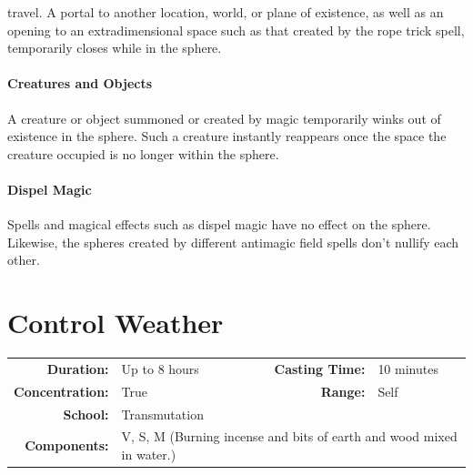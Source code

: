 \documentclass[12pt,showtrims]{memoir}
\begin{document}
travel. A portal to another location, world, or plane of existence, as well as an opening to an extradimensional space such as that created by the rope trick spell, temporarily closes while in the sphere. \paragraph{Creatures and Objects} A creature or object summoned or created by magic temporarily winks out of existence in the sphere. Such a creature instantly reappears once the space the creature occupied is no longer within the sphere. \paragraph{Dispel Magic} Spells and magical effects such as dispel magic have no effect on the sphere. Likewise, the spheres created by different antimagic field spells don't nullify each other.

\newpage
\section*{Control Weather}

{
\small\centering\vspace{-6pt}
\begin{tabular}{rlrl}
\toprule

\textbf{Duration:} & Up to 8 hours &
\textbf{Casting Time:} & 10 minutes \\
\textbf{Concentration:} & True &
\textbf{Range:} & Self \\
\textbf{School:} & Transmutation \\
\textbf{Components:} & \multicolumn{3}{p{0.7\textwidth}}{V, S, M (Burning incense and bits of earth and wood mixed in water.)}\\

\bottomrule
\end{tabular}
}
\end{document}
